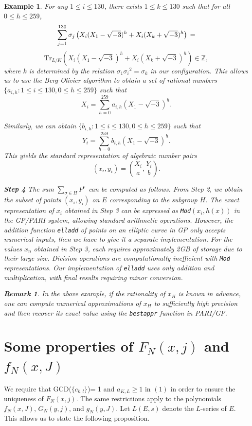 \documentclass[10pt, a4paper]{article}
\newtheorem{example}[theorem]{Example}
\newtheorem{remark}[theorem]{Remark}
\begin{document}
\begin{example}
For any $1 \leq i \leq 130$, there exists $1 \leq k \leq 130$ such that for all $0 \leq h \leq 259$,
\[
\sum_{j=1}^{130} \sigma_j\left(X_i (X_1 - \sqrt{-3})^{h} + X_i (X_k + \sqrt{-3})^{h}\right)\\
=
\]\[
\text{Tr}_{L/K}\left(X_i (X_1 - \sqrt{-3})^{h} + X_i (X_k + \sqrt{-3})^{h}\right) \in \mathbb{Z},
\]
 where $k$ is determined by the relation ${\sigma _1}{\sigma _i}^2 = {\sigma _k}$ in our configuration.
This allows us to use the Berg-Olivier algorithm \cite{Cohen}  to obtain a set of rational numbers
$\{ a_{i,h} : 1 \leq i \leq 130, 0 \leq h \leq 259 \}$ such that
\[
X_i = \sum_{h=0}^{259} a_{i,h} (X_1 - \sqrt{-3})^{h}.
\]

Similarly, we can obtain  $\{b_{i,h}:1 \leq i \leq 130, 0 \leq h \leq 259\}$ such that
\[
Y_i = \sum_{h=0}^{259} b_{i,h}(X_1 - \sqrt{-3})^h.
\]
This yields the standard representation of algebraic number pairs
\[
(x_i, y_i) = \left(\frac{X_i}{a}, \frac{Y_i}{b}\right).
\]

{\bf Step 4} The sum $\sum_{\sigma \in H} P^\sigma$ can be computed as follows.
 From Step 2, we obtain the subset of points $(x_i, y_i)$ on $E$ corresponding to the subgroup $H$.
 The exact representation of $x_i$ obtained in Step 3 can be expressed as \texttt{Mod}$(x_i, h(x))$ in the GP/PARI system, allowing standard arithmetic operations.
However, the addition function \texttt{elladd} of points on an  elliptic curve  in GP only accepts numerical inputs, then we have to give it a separate implementation.
For the values $x_n$  obtained in Step 3, each requires approximately 2GB of storage due to their large size.
Division operations are computationally inefficient with \texttt{Mod} representations. Our implementation of \texttt{elladd} uses only addition and multiplication, with final results requiring minor conversion.

\begin{remark}
In the above example, if the rationality of $x_H$ is known in advance,
one can compute numerical approximations of $x_H$ to sufficiently high precision
and then recover its exact value using the \texttt{bestappr} function in PARI/GP.
\end{remark}
\end{example}
\section{Some properties of $F_N(x,j)$ and $f_N(x, J)$}
We require that GCD($\{c_{k,l}\}$)= 1 and $a_{K,L} \geq 1$ in $(1) $ in order to ensure the uniqueness of $F_N(x, j)$.
The same restrictions apply to the polynomials $f_N(x, J)$, $G_N(y, j)$, and $g_N(y, J)$. Let $L(E, s)$ denote the $L$-series of $E$. This allows us to state the following proposition.
\end{document}
